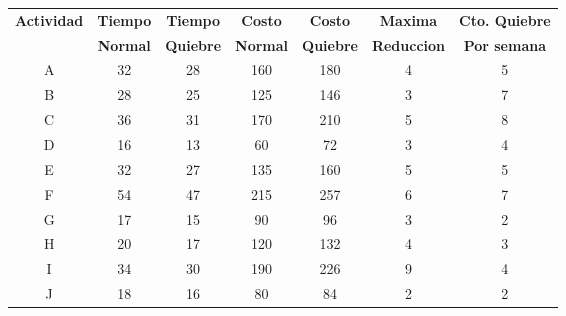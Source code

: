 \begin{tabular}{ccccccc}
\textbf{Actividad} & \textbf{Tiempo} & \textbf{Tiempo} & \textbf{Costo} & \textbf{Costo} & \textbf{Maxima} & \textbf{Cto. Quiebre} \\
       & \textbf{Normal} & \textbf{Quiebre} & \textbf{Normal} & \textbf{Quiebre} & \textbf{Reduccion} & \textbf{Por semana} \bigstrut[b]\\
\hline
\hline
A      & 32     & 28     & 160    & 180    & 4      & 5 \bigstrut[t]\\
B      & 28     & 25     & 125    & 146    & 3      & 7 \\
C      & 36     & 31     & 170    & 210    & 5      & 8 \\
D      & 16     & 13     & 60     & 72     & 3      & 4 \\
E      & 32     & 27     & 135    & 160    & 5      & 5 \\
F      & 54     & 47     & 215    & 257    & 6      & 7 \\
G      & 17     & 15     & 90     & 96     & 3      & 2 \\
H      & 20     & 17     & 120    & 132    & 4      & 3 \\
I      & 34     & 30     & 190    & 226    & 9      & 4 \\
J      & 18     & 16     & 80     & 84     & 2      & 2 \bigstrut[b]\\
\hline
\hline
\end{tabular}%
